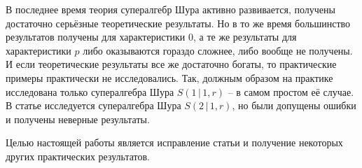 
В последнее время теория супералгебр Шура активно развивается, получены достаточно серьёзные теоретические результаты.
Но в то же время большинство результатов получены для характеристики 0, а те же результаты для характеристики $p$ 
либо оказываются гораздо сложнее, либо вообще не получены. И если теоретические результаты все же достаточно богаты, то
практические примеры практически не исследовались. Так, должным образом на практике исследована только 
супералгебра Шура $ S(1\,|\,1, r) $ -- в самом простом её случае. В статье \cite{base_article} исследуется супералгебра Шура
$ S(2\,|\,1, r) $, но были допущены ошибки и получены неверные результаты.

Целью настоящей работы является исправление статьи и получение некоторых других практических результатов.
